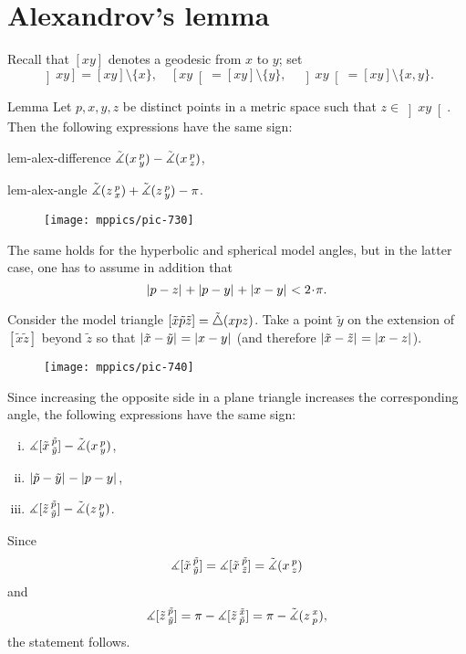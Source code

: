 \section{Alexandrov's lemma}

Recall that $[xy]$ denotes a geodesic from $x$ to $y$;
set  
\[
\left]x y\right]=[xy]\setminus\{x\},
\quad
\left[x y\right[=[xy]\setminus\{y\},
\quad
\left]x y\right[=[xy]\setminus\{x,y\}.\]

\begin{thm}{Lemma}
\label{lem:alex}  
Let $p,x,y,z$ be distinct points in a metric space such that $z\in \left]x y\right[$.
Then 
the following expressions have the same sign:

\begin{subthm}{lem-alex-difference}
$\tilde\measuredangle(x\,{}^{p}_{y})
-\tilde\measuredangle(x\,{}^{p}_{z})$,
\end{subthm} 

\begin{subthm}{lem-alex-angle}
$\tilde\measuredangle(z\,{}^{p}_{x})
+\tilde\measuredangle(z\,{}^{p}_{y}) -\pi$.
\end{subthm}

\begin{wrapfigure}{r}{25mm}
\vskip-6mm
\centering
\texttt{[image: mppics/pic-730]}
\end{wrapfigure}

The same holds for the hyperbolic and spherical model angles, 
but in the latter case, one has to assume in addition that
\[\dist{p}{z}{}+\dist{p}{y}{}+\dist{x}{y}{}< 2\cdot\pi.\]

\end{thm}

Consider the model triangle $[\tilde x\tilde p\tilde z]=\tilde\triangle(x p z)$.
Take 
a point $\tilde y$ on the extension of 
$[\tilde x \tilde z]$ beyond $\tilde z$ so that $\dist{\tilde x}{\tilde y}{}=\dist{x}{y}{}$ (and therefore $\dist{\tilde x}{\tilde z}{}=\dist{x}{z}{}$). 

\begin{wrapfigure}{r}{33mm}
\vskip-0mm
\centering
\texttt{[image: mppics/pic-740]}
\end{wrapfigure}

Since increasing the opposite side in a plane triangle increases the corresponding angle, 
the following expressions have the same sign:
\begin{enumerate}[(i)]
\item $\measuredangle[\tilde x\,{}^{\tilde p}_{\tilde y}]-\tilde\measuredangle(x\,{}^{p}_{y})$,
\item $\dist{\tilde p}{\tilde y}{}-\dist{p}{y}{}$,
\item $\measuredangle[\tilde z\,{}^{\tilde p}_{\tilde y}]-\tilde\measuredangle(z\,{}^{p}_{y})$.
\end{enumerate}
Since 
\[\measuredangle[\tilde x\,{}^{\tilde p}_{\tilde y}]=\measuredangle[\tilde x\,{}^{\tilde p}_{\tilde z}]=\tilde\measuredangle(x\,{}^{p}_{z})\]
and
\[ \measuredangle[\tilde z\,{}^{\tilde p}_{\tilde y}]
=\pi-\measuredangle[\tilde z\,{}^{\tilde x}_{\tilde p}]
=\pi-\tilde\measuredangle(z\,{}^{x}_{p}),\]
the statement follows.

